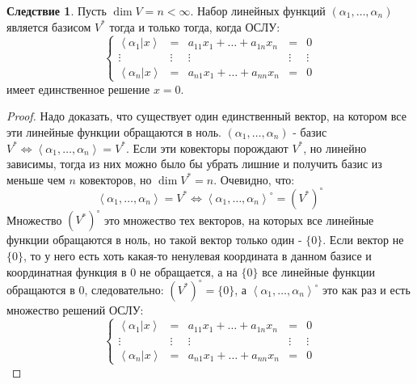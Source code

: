 \documentclass[12pt]{article}
\theoremstyle{definition}
\newtheorem{corollary}{Следствие}
\newcommand{\linsp}[1]{\left\langle #1 \right\rangle }
\newcommand{\linmer}[2]{\left\langle #1 \vert #2\right\rangle }
\begin{document}
\begin{corollary}
	Пусть $\dim{V} = n < \infty$. Набор линейных функций $(\alpha_1,\dotsc,\alpha_n)$ является базисом $V^*$ тогда и только тогда, когда ОСЛУ:
	$$
		\left\{
		\begin{array}{ccccc}
			\linmer{\alpha_1}{x} & = & a_{11} x_{1} + \dotsc + a_{1n} x_{n}  & = & 0 \\
			\vdots & \vdots & \vdots & \vdots & \vdots\\
			\linmer{\alpha_n}{x} & = & a_{n1} x_{1} + \dotsc + a_{nn} x_{n} & = & 0
		\end{array}
		\right.
	$$
	имеет единственное решение $x = 0$.
\end{corollary}
\begin{proof}
	Надо доказать, что существует один единственный вектор, на котором все эти линейные функции обращаются в ноль. $(\alpha_1,\dotsc,\alpha_n)$ - базис $V^* \Leftrightarrow \linsp{\alpha_1,\dotsc,\alpha_n} = V^*$. Если эти ковекторы порождают $V^*$, но линейно зависимы, тогда из них можно было бы убрать лишние и получить базис из меньше чем $n$ ковекторов, но $\dim{V^*} = n$. Очевидно, что:
	$$
		\linsp{\alpha_1,\dotsc,\alpha_n} = V^* \Leftrightarrow \linsp{\alpha_1,\dotsc,\alpha_n}^{\circ} = (V^*)^{\circ}
	$$
	Множество $(V^*)^{\circ}$ это множество тех векторов, на которых все линейные функции обращаются в ноль, но такой вектор только один - $\{0\}$. Если вектор не $\{0\}$, то у него есть хоть какая-то ненулевая координата в данном базисе и координатная функция в $0$ не обращается, а на $\{0\}$ все линейные функции обращаются в $0$, следовательно: $(V^*)^{\circ} = \{0\}$, а $\linsp{\alpha_1,\dotsc,\alpha_n}^{\circ}$ это как раз и есть множество решений ОСЛУ:
	$$
		\left\{
		\begin{array}{ccccc}
			\linmer{\alpha_1}{x} & = & a_{11} x_{1} + \dotsc + a_{1n} x_{n}  & = & 0 \\
			\vdots & \vdots & \vdots & \vdots & \vdots\\
			\linmer{\alpha_n}{x} & = & a_{n1} x_{1} + \dotsc + a_{nn} x_{n} & = & 0
		\end{array}
		\right.
	$$
\end{proof}
\end{document}
